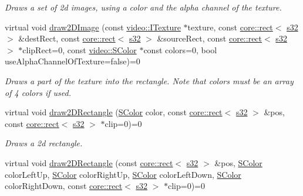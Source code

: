 \begin{DoxyCompactItemize}
\begin{DoxyCompactList}\small\item\em Draws a set of 2d images, using a color and the alpha channel of the texture. \end{DoxyCompactList}\item 
virtual void \hyperlink{classirr_1_1video_1_1IVideoDriver_a49258725a8c36dbb22d073acf7927354}{draw2\+D\+Image} (const \hyperlink{classirr_1_1video_1_1ITexture}{video\+::\+I\+Texture} $\ast$texture, const \hyperlink{classirr_1_1core_1_1rect}{core\+::rect}$<$ \hyperlink{namespaceirr_ac66849b7a6ed16e30ebede579f9b47c6}{s32} $>$ \&dest\+Rect, const \hyperlink{classirr_1_1core_1_1rect}{core\+::rect}$<$ \hyperlink{namespaceirr_ac66849b7a6ed16e30ebede579f9b47c6}{s32} $>$ \&source\+Rect, const \hyperlink{classirr_1_1core_1_1rect}{core\+::rect}$<$ \hyperlink{namespaceirr_ac66849b7a6ed16e30ebede579f9b47c6}{s32} $>$ $\ast$clip\+Rect=0, const \hyperlink{classirr_1_1video_1_1SColor}{video\+::\+S\+Color} $\ast$const colors=0, bool use\+Alpha\+Channel\+Of\+Texture=false)=0
\begin{DoxyCompactList}\small\item\em Draws a part of the texture into the rectangle. Note that colors must be an array of 4 colors if used. \end{DoxyCompactList}\item 
virtual void \hyperlink{classirr_1_1video_1_1IVideoDriver_ac7f452fae0ef8abe01768a78ba7033b7}{draw2\+D\+Rectangle} (\hyperlink{classirr_1_1video_1_1SColor}{S\+Color} color, const \hyperlink{classirr_1_1core_1_1rect}{core\+::rect}$<$ \hyperlink{namespaceirr_ac66849b7a6ed16e30ebede579f9b47c6}{s32} $>$ \&pos, const \hyperlink{classirr_1_1core_1_1rect}{core\+::rect}$<$ \hyperlink{namespaceirr_ac66849b7a6ed16e30ebede579f9b47c6}{s32} $>$ $\ast$clip=0)=0
\begin{DoxyCompactList}\small\item\em Draws a 2d rectangle. \end{DoxyCompactList}\item 
virtual void \hyperlink{classirr_1_1video_1_1IVideoDriver_a83bb3c30be6c9f960a4d8b625d7dee8c}{draw2\+D\+Rectangle} (const \hyperlink{classirr_1_1core_1_1rect}{core\+::rect}$<$ \hyperlink{namespaceirr_ac66849b7a6ed16e30ebede579f9b47c6}{s32} $>$ \&pos, \hyperlink{classirr_1_1video_1_1SColor}{S\+Color} color\+Left\+Up, \hyperlink{classirr_1_1video_1_1SColor}{S\+Color} color\+Right\+Up, \hyperlink{classirr_1_1video_1_1SColor}{S\+Color} color\+Left\+Down, \hyperlink{classirr_1_1video_1_1SColor}{S\+Color} color\+Right\+Down, const \hyperlink{classirr_1_1core_1_1rect}{core\+::rect}$<$ \hyperlink{namespaceirr_ac66849b7a6ed16e30ebede579f9b47c6}{s32} $>$ $\ast$clip=0)=0

\end{DoxyCompactItemize}
